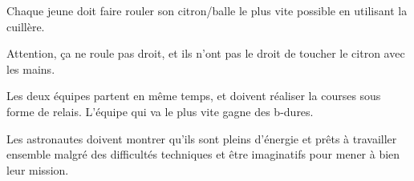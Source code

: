 \documentclass{grand-jeu}
\begin{document}
\begin{liste-materiel}
\end{liste-materiel}

\begin{regles}
Chaque jeune doit faire rouler son citron/balle le plus vite possible en utilisant la cuillère. 

Attention, ça ne roule pas droit, et ils n'ont pas le droit de toucher le citron avec les mains.

Les deux équipes partent en même temps, et doivent réaliser la courses sous forme de relais. L’équipe qui va le plus vite gagne des b-dures. 
\end{regles}

\begin{imaginaire}
Les astronautes doivent montrer qu'ils sont pleins d'énergie et prêts à travailler ensemble malgré des difficultés techniques et être imaginatifs  pour mener à bien leur mission.  
\end{imaginaire}

\begin{moments-stop}
\end{moments-stop}
\end{document}
